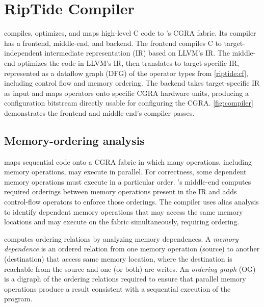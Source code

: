 \newcommand{\pes}{PEs\xspace}
\newcommand{\fend}{frontend\xspace}
\newcommand{\mend}{middle-end\xspace}
\newcommand{\bend}{backend\xspace}

\section{RipTide Compiler}
\label{riptide:compiler}

\figRipTideCompiler
\figRipTideLSO

\riptidecomp compiles, optimizes, and maps high-level C code to \riptide's CGRA fabric. 
%
Its compiler has a \fend, \mend, and \bend.
%
The \fend compiles C to target-independent intermediate representation
(IR) based on LLVM's IR.
%
The \mend optimizes the code in LLVM's IR, then translates to
target-specific IR, represented as a dataflow graph (DFG) of the operator
types from \autoref{riptide:cf}, including control flow and memory ordering.  
%
The \bend takes target-specific IR as input and maps operators onto specific
CGRA hardware units, producing a configuration bitstream directly usable for
configuring the CGRA.
%
\autoref{fig:compiler} demonstrates the \fend and \mend's compiler passes. 
%

\subsection{Memory-ordering analysis}

\riptidecomp maps sequential code onto a CGRA fabric in which many operations,
including memory operations, may execute in parallel.  
%
For correctness, some dependent memory operations must execute in a particular
order.
%
\riptidecomp's \mend computes required orderings between memory operations present
in the IR and adds control-flow operators to enforce those orderings. 
%
The compiler uses alias analysis to identify dependent memory operations that
may access the same memory locations and may execute on the \riptide fabric
simultaneously, requiring ordering.  

\riptidecomp computes ordering relations by analyzing memory dependences.  
%
A \textit{memory dependence} is an ordered relation from one memory operation
(source) to another (destination) that access same memory location,
where the destination is reachable from the source and one (or both)
are writes.
%
An \textit{ordering graph} (OG) is a digraph of the ordering relations
required to ensure that parallel memory operations produce a
result consistent with a sequential execution of the program.
%

